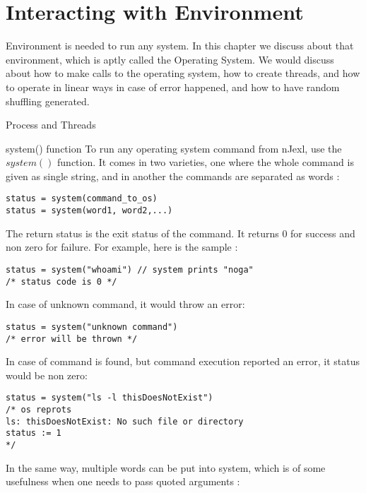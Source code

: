\chapter{Interacting with Environment}\label{interaction}

{\LARGE E}nvironment is needed to run any system.
In this chapter we discuss about that environment, which is aptly called the Operating System.
We would discuss about how to make calls to the operating system, how to create threads, 
and how to operate in linear ways in case of error happened, and how to have random shuffling generated.  

\begin{section}{Process and Threads}

\begin{subsection}{system() function}
To run any operating system command from nJexl, use the $system()$ function.
It comes in two varieties, one where the whole command is given as single string, 
and in another the commands are separated as words :
\begin{lstlisting}[style=JexlStyle]
status = system(command_to_os)
status = system(word1, word2,...)
\end{lstlisting}
The return status is the exit status of the command.
It returns 0 for success and non zero for failure.
For example, here is the sample :

\begin{lstlisting}[style=JexlStyle]
status = system("whoami") // system prints "noga"
/* status code is 0 */
\end{lstlisting}

In case of unknown command, it would throw an error:

\begin{lstlisting}[style=JexlStyle]
status = system("unknown command") 
/* error will be thrown */
\end{lstlisting}

In case of command is found, but command execution 
reported an error, it status would  be non zero:

\begin{lstlisting}[style=JexlStyle]
status = system("ls -l thisDoesNotExist") 
/* os reprots 
ls: thisDoesNotExist: No such file or directory
status := 1
*/
\end{lstlisting}

In the same way, multiple words can be put into system,
which is of some usefulness when one needs to pass quoted arguments :


\end{subsection}
\end{section}

